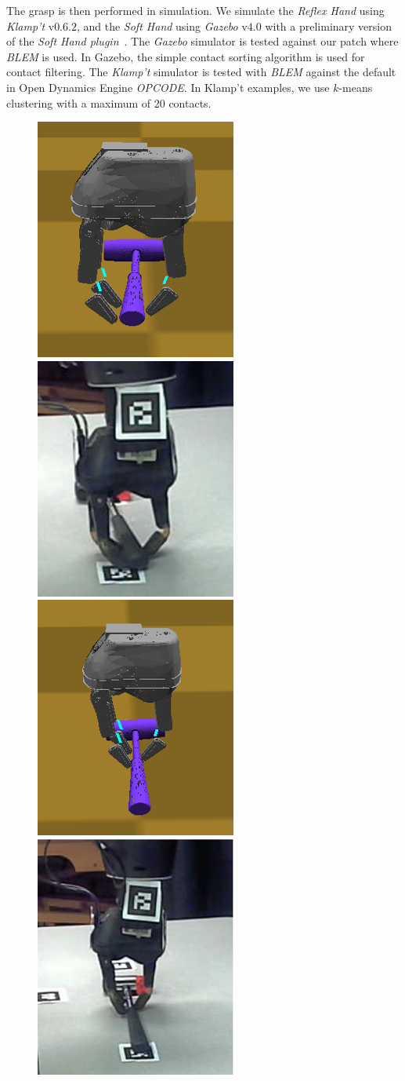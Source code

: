 The grasp is then performed in simulation.
We simulate the \emph{Reflex Hand} using \emph{Klamp't} v$0.6.2$, and the \emph{Soft Hand} using \emph{Gazebo} v$4.0$ with a preliminary version of the \emph{Soft Hand plugin}~\cite{Rosales15SHP}.
The \emph{Gazebo} simulator is tested against our patch \cite{Rocchi15GBP} where \emph{BLEM} is used. In Gazebo, the simple contact sorting algorithm is used for contact filtering. The \emph{Klamp't} simulator is tested with  \emph{BLEM} against the default in Open Dynamics Engine \emph{OPCODE}.  In Klamp't examples, we use $k$-means clustering with a maximum of 20 contacts.



\begin{figure}[!!hbt]
\begin{center}
{ \includegraphics[width=0.30\columnwidth]     {images/ssoch/fig/hammer_P1}    \label{hammer_P1}}
{ \includegraphics[width=0.30\columnwidth]     {images/ssoch/fig/hammer_p1_1}    \label{hammer_p1_1}}
{ \includegraphics[width=0.30\columnwidth]     {images/ssoch/fig/hammer_P2}    \label{hammer_P2}}
{ \includegraphics[width=0.30\columnwidth]     {images/ssoch/fig/hammer_p2_1}    \label{hammer_p2_1}}

\end{center}
\end{figure}
